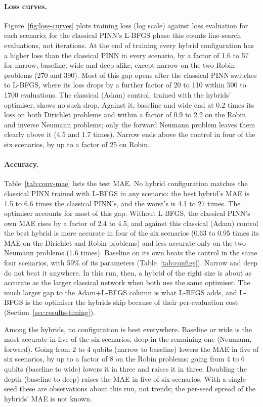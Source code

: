 \paragraph{Loss curves.}
Figure~\ref{fig:loss-curves} plots training loss (log scale) against loss evaluation for each scenario; for
the classical PINN's L-BFGS phase this counts line-search evaluations, not iterations. At the end of training
every hybrid configuration has a higher loss than the classical PINN in every scenario, by a factor of 1.6 to
57 for narrow, baseline, wide and deep alike, except narrow on the two Robin problems (270 and 390). Most of
this gap opens after the classical PINN switches to L-BFGS, where its loss drops by a further factor of 20 to
110 within 500 to 1700 evaluations. The classical (Adam) control, trained with the hybrids' optimiser,
shows no such drop. Against it, baseline and wide end at 0.2 times its loss on both Dirichlet problems and
within a factor of 0.9 to 2.2 on the Robin and inverse Neumann problems; only the forward Neumann problem
leaves them clearly above it (4.5 and 1.7 times). Narrow ends above the control in four of the six scenarios, by
up to a factor of 25 on Robin.

\paragraph{Accuracy.}
Table~\ref{tab:conv-mae} lists the test MAE. No hybrid configuration matches the classical PINN trained with
L-BFGS in any scenario: the best hybrid's MAE is 1.5 to 6.6 times the classical PINN's, and the worst's is
4.1 to 27 times. The optimiser accounts for most of this gap. Without L-BFGS, the classical PINN's own MAE
rises by a factor of 2.4 to 4.5, and against this classical (Adam) control the best hybrid is more accurate
in four of the six scenarios (0.63 to 0.95 times its MAE on the Dirichlet and Robin problems) and less
accurate only on the two Neumann problems (1.6 times). Baseline on its own beats the control in the same four
scenarios, with 59\% of its parameters (Table~\ref{tab:configs}). Narrow and deep do not beat it anywhere.
In this run, then, a hybrid of the right size is about as accurate as the larger classical network when both
use the same optimiser. The much larger gap to the Adam+L-BFGS column is what L-BFGS adds, and L-BFGS is the
optimiser the hybrids skip because of their per-evaluation cost (Section~\ref{sec:results-timing}).

Among the hybrids, no configuration is best everywhere. Baseline or wide is the most accurate in five of the
six scenarios, deep in the remaining one (Neumann, forward). Going from 2 to 4 qubits (narrow to baseline)
lowers the MAE in five of six scenarios, by up to a factor of 8 on the Robin problems; going from 4 to 6
qubits (baseline to wide) lowers it in three and raises it in three. Doubling the depth (baseline to deep)
raises the MAE in five of six scenarios. With a single seed these are observations about this run, not
trends; the per-seed spread of the hybrids' MAE is not known.

